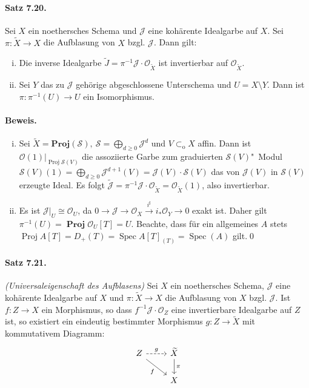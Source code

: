 \paragraph{Satz 7.20.}\label{7.20} Sei $X$ ein noethersches Schema und $\mathcal{J}$ eine kohärente Idealgarbe auf $X$. Sei $\pi:\widetilde{X}\to X$ die Aufblasung von $X$ bzgl. $\mathcal{J}$. Dann gilt:
\begin{enumerate}[(i)]
\item Die inverse Idealgarbe $\widetilde{J}=\pi^{-1}\mathcal{J}\cdot\mathcal{O}_{\widetilde{X}}$ ist invertierbar auf $\mathcal{O}_{\widetilde{X}}$.
\item Sei $Y$ das zu $\mathcal{J}$ gehörige abgeschlossene Unterschema und $U=X\setminus Y$. Dann ist $\pi:\pi^{-1}(U)\to U$ ein Isomorphismus.
\end{enumerate}

\paragraph{Beweis.}\begin{enumerate}[(i)]
\item Sei $\widetilde{X}=\mathbf{Proj}(\mathcal{S}),\ \mathcal{S}=\bigoplus_{d\geq 0}\mathcal{J}^d$ und $V\subset_\text{o}X$ affin. Dann ist $\mathcal{O}(1)|_{\operatorname{Proj}\mathcal{S}(V)}$ die assoziierte Garbe zum graduierten $\mathcal{S}(V)$"~Modul $\mathcal{S}(V)(1)=\bigoplus_{d\geq 0}\mathcal{J}^{d+1}(V)=\mathcal{J}(V)\cdot \mathcal{S}(V)$ das von $\mathcal{J}(V)$ in $\mathcal{S}(V)$ erzeugte Ideal. Es folgt $\widetilde{\mathcal{J}}=\pi^{-1}\mathcal{J}\cdot\mathcal{O}_{\widetilde{X}}=\mathcal{O}_{\widetilde{X}}(1)$, also invertierbar.
\item Es ist $\mathcal{J}|_U\cong\mathcal{O}_U$, da $0\to\mathcal{J}\to\mathcal{O}_X\stackrel{i^\sharp}{\to }i_\ast\mathcal{O}_Y\to 0$ exakt ist. Daher gilt $\pi^{-1}(U)=\operatorname{\mathbf{Proj}}\mathcal{O}_U[T]=U$. Beachte, dass für ein allgemeines $A$ stets $\operatorname{Proj}A[T]=D_+(T)=\operatorname{Spec}A[T]_{(T)}=\operatorname{Spec}(A)$ gilt.\qed
\end{enumerate}

\paragraph{Satz 7.21.}\label{7.21} \textit{(Universaleigenschaft des Aufblasens)} Sei $X$ ein noethersches Schema, $\mathcal{J}$ eine kohärente Idealgarbe auf $X$ und $\pi:\widetilde{X}\to X$ die Aufblasung von $X$ bzgl. $\mathcal{J}$. Ist $f:Z\to X$ ein Morphismus, so dass $f^{-1}\mathcal{J}\cdot\mathcal{O}_Z$ eine invertierbare Idealgarbe auf $Z$ ist, so existiert ein eindeutig bestimmter Morphismus $g:Z\to\widetilde{X}$ mit kommutativem Diagramm:
\[\begin{tikzcd}
Z\rar["g", dashed]\ar[rd, "f"'] & \widetilde{X}\dar["\pi"]\\
& X
\end{tikzcd} \]

